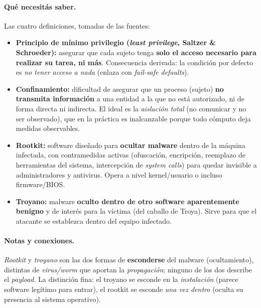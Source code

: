 \paragraph{Qué necesitás saber.}
Las cuatro definiciones, tomadas de las fuentes:
\begin{itemize}
  \item \textbf{Principio de mínimo privilegio (\emph{least privilege}, Saltzer \& Schroeder):}
        asegurar que cada sujeto tenga \textbf{solo el acceso necesario para realizar su tarea,
        ni más}. Consecuencia derivada: la condición por defecto es \emph{no tener acceso a
        nada} (enlaza con \emph{fail-safe defaults}).
  \item \textbf{Confinamiento:} dificultad de asegurar que un proceso (sujeto) \textbf{no
        transmita información} a una entidad a la que no está autorizado, ni de forma directa
        ni indirecta. El ideal es la \emph{aislación total} (no comunicar y no ser observado),
        que en la práctica es inalcanzable porque todo cómputo deja medidas observables.
  \item \textbf{Rootkit:} software diseñado para \textbf{ocultar malware} dentro de la máquina
        infectada, con contramedidas activas (ofuscación, encripción, reemplazo de
        herramientas del sistema, intercepción de \emph{system calls}) para quedar invisible a
        administradores y antivirus. Opera a nivel kernel/usuario o incluso firmware/BIOS.
  \item \textbf{Troyano:} malware \textbf{oculto dentro de otro software aparentemente benigno}
        y de interés para la víctima (del caballo de Troya). Sirve para que el atacante se
        establezca dentro del equipo infectado.
\end{itemize}

\paragraph{Notas y conexiones.}
\emph{Rootkit} y \emph{troyano} son las dos formas de \textbf{esconderse} del malware
(ocultamiento), distintas de \emph{virus/worm} que aportan la \emph{propagación}; ninguno de
los dos describe el \emph{payload}. La distinción fina: el troyano se esconde en la
\emph{instalación} (parece software legítimo para entrar), el rootkit se esconde
\emph{una vez dentro} (oculta su presencia al sistema operativo).

